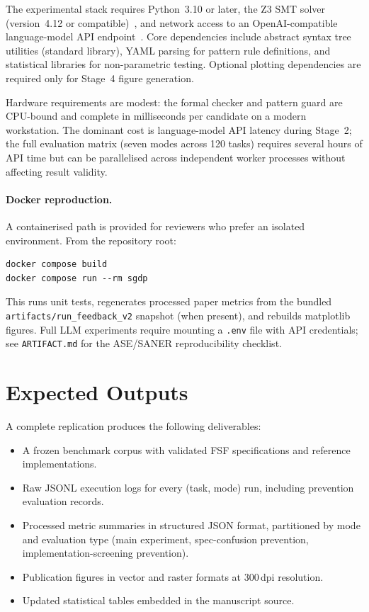 The experimental stack requires Python~3.10 or later, the Z3 SMT solver
(version~4.12 or compatible)~\citep{demoura2008z3}, and network access to an OpenAI-compatible
language-model API endpoint~\citep{openai2023gpt4}.  Core dependencies include abstract syntax tree
utilities (standard library), YAML parsing for pattern rule definitions, and
statistical libraries for non-parametric testing.  Optional plotting
dependencies are required only for Stage~4 figure generation.

Hardware requirements are modest: the formal checker and pattern guard are
CPU-bound and complete in milliseconds per candidate on a modern workstation.
The dominant cost is language-model API latency during Stage~2; the full
evaluation matrix (seven modes across 120 tasks) requires several hours of
API time but can be parallelised across independent worker processes without
affecting result validity.

\paragraph{Docker reproduction.}
A containerised path is provided for reviewers who prefer an isolated environment.
From the repository root:
\begin{verbatim}
docker compose build
docker compose run --rm sgdp
\end{verbatim}
This runs unit tests, regenerates processed paper metrics from the bundled
\texttt{artifacts/run\_feedback\_v2} snapshot (when present), and rebuilds
matplotlib figures.
Full LLM experiments require mounting a \texttt{.env} file with API credentials;
see \texttt{ARTIFACT.md} for the ASE/SANER reproducibility checklist.

\section{Expected Outputs}
\label{sec:repro:outputs}

A complete replication produces the following deliverables:

\begin{itemize}
  \item A frozen benchmark corpus with validated FSF specifications and
        reference implementations.
  \item Raw JSONL execution logs for every (task, mode) run, including
        prevention evaluation records.
  \item Processed metric summaries in structured JSON format, partitioned by
        mode and evaluation type (main experiment, spec-confusion prevention,
        implementation-screening prevention).
  \item Publication figures in vector and raster formats at 300\,dpi
        resolution.
  \item Updated statistical tables embedded in the manuscript source.
\end{itemize}

